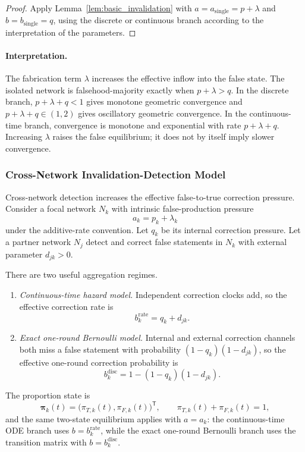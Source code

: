 \documentclass[12pt]{article}
\theoremstyle{definition}
\begin{document}
\begin{proof}
Apply Lemma~\ref{lem:basic_invalidation} with
$a=a_{\mathrm{single}}=p+\lambda$ and $b=b_{\mathrm{single}}=q$, using the
discrete or continuous branch according to the interpretation of the parameters.
\end{proof}

\paragraph{Interpretation.}
The fabrication term $\lambda$ increases the effective inflow into the false
state.  The isolated network is falsehood-majority exactly when
$p+\lambda>q$.  In the discrete branch, $p+\lambda+q<1$ gives monotone
geometric convergence and $p+\lambda+q\in(1,2)$ gives oscillatory geometric
convergence.  In the continuous-time branch, convergence is monotone and
exponential with rate $p+\lambda+q$.  Increasing $\lambda$ raises the false
equilibrium; it does not by itself imply slower convergence.

\subsubsection{Cross-Network Invalidation-Detection Model}
\label{sec:cross-network-detection}

Cross-network detection increases the effective false-to-true correction
pressure.  Consider a focal network $N_k$ with intrinsic false-production
pressure
\[
    a_k=p_k+\lambda_k
\]
under the additive-rate convention.  Let $q_k$ be its internal correction
pressure.  Let a partner network $N_j$ detect and correct false statements in
$N_k$ with external parameter $d_{jk}>0$.

There are two useful aggregation regimes.
\begin{enumerate}
\item \emph{Continuous-time hazard model.}  Independent correction clocks add,
      so the effective correction rate is
      \begin{equation}\label{eq:b-cross-rate}
      b_k^{\mathrm{rate}}=q_k+d_{jk}.
      \end{equation}
\item \emph{Exact one-round Bernoulli model.}  Internal and external correction
      channels both miss a false statement with probability
      $(1-q_k)(1-d_{jk})$, so the effective one-round correction probability is
      \begin{equation}\label{eq:b-cross-disc}
      b_k^{\mathrm{disc}}=1-(1-q_k)(1-d_{jk}).
      \end{equation}
\end{enumerate}
The proportion state is
\[
\boldsymbol{\pi}_k(t)=\bigl(\pi_{T,k}(t),\pi_{F,k}(t)\bigr)^{\mathsf T},
\qquad \pi_{T,k}(t)+\pi_{F,k}(t)=1,
\]
and the same two-state equilibrium applies with $a=a_k$: the continuous-time
ODE branch uses $b=b_k^{\mathrm{rate}}$, while the exact one-round Bernoulli
branch uses the transition matrix with $b=b_k^{\mathrm{disc}}$.
\end{document}
